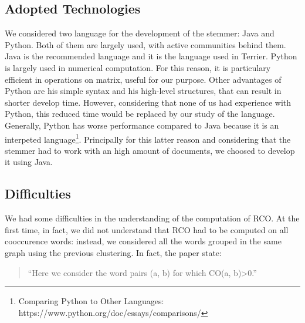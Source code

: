 \documentclass[10pt,a4paper]{article}
\begin{document}
\subsection{Adopted Technologies}
We considered two language for the development of the stemmer: Java and Python. Both of them are largely used, with active communities behind them. Java is the recommended language and it is the language used in Terrier. Python is largely used in numerical computation. For this reason, it is particulary efficient in operations on matrix, useful for our purpose. Other advantages of Python are his simple syntax and his high-level structures, that can result in shorter develop time. However, considering that none of us had experience with Python, this reduced time would be replaced by our study of the language. 
Generally, Python has worse performance compared to Java because it is an interpeted language\footnote{Comparing Python to Other Languages: https://www.python.org/doc/essays/comparisons/}. Principally for this latter reason and considering that the stemmer had to work with an high amount of documents, we choosed to develop it using Java.

\subsection{Difficulties}
We had some difficulties in the understanding of the computation of RCO. At the first time, in fact, we did not understand that RCO had to be computed on all cooccurence words: instead, we considered all the words grouped in the same graph using the previous clustering. In fact, the paper state:
\begin{quotation}
``Here we consider the word pairs (a, b) for which CO(a, b)\textgreater 0.''
\end{quotation}



\end{document}
